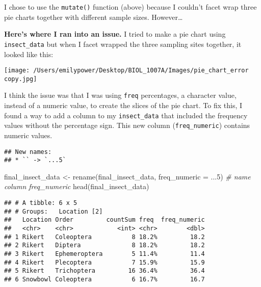 \documentclass[
]{article}
\newenvironment{Shaded}{\begin{snugshade}}{\end{snugshade}}
\newcommand{\AttributeTok}[1]{\textcolor[rgb]{0.77,0.63,0.00}{#1}}
\newcommand{\CommentTok}[1]{\textcolor[rgb]{0.56,0.35,0.01}{\textit{#1}}}
\newcommand{\DecValTok}[1]{\textcolor[rgb]{0.00,0.00,0.81}{#1}}
\newcommand{\FunctionTok}[1]{\textcolor[rgb]{0.00,0.00,0.00}{#1}}
\newcommand{\NormalTok}[1]{#1}
\newcommand{\OtherTok}[1]{\textcolor[rgb]{0.56,0.35,0.01}{#1}}
\newcommand{\SpecialCharTok}[1]{\textcolor[rgb]{0.00,0.00,0.00}{#1}}
\newcommand{\StringTok}[1]{\textcolor[rgb]{0.31,0.60,0.02}{#1}}
\begin{document}
I chose to use the \texttt{mutate()} function (above) because I couldn't
facet wrap three pie charts together with different sample sizes.
However\ldots{}

\textbf{Here's where I ran into an issue.} I tried to make a pie chart
using \texttt{insect\_data} but when I facet wrapped the three sampling
sites together, it looked like this:

\texttt{[image: /Users/emilypower/Desktop/BIOL\_1007A/Images/pie\_chart\_error copy.jpg]}

I think the issue was that I was using \texttt{freq} percentages, a
character value, instead of a numeric value, to create the slices of the
pie chart. To fix this, I found a way to add a column to my
\texttt{insect\_data} that included the frequency values without the
percentage sign. This new column (\texttt{freq\_numeric}) contains
numeric values.

\begin{Shaded}
\end{Shaded}

\begin{verbatim}
## New names:
## * `` -> `...5`
\end{verbatim}

\begin{Shaded}
\begin{Highlighting}[]
\NormalTok{final\_insect\_data }\OtherTok{\textless{}{-}} \FunctionTok{rename}\NormalTok{(final\_insect\_data, }\AttributeTok{freq\_numeric =}\NormalTok{ ...}\DecValTok{5}\NormalTok{)  }\CommentTok{\# name column \textasciigrave{}freq\_numeric\textasciigrave{}}
\FunctionTok{head}\NormalTok{(final\_insect\_data)}
\end{Highlighting}
\end{Shaded}

\begin{verbatim}
## # A tibble: 6 x 5
## # Groups:   Location [2]
##   Location Order         countSum freq  freq_numeric
##   <chr>    <chr>            <int> <chr>        <dbl>
## 1 Rikert   Coleoptera           8 18.2%         18.2
## 2 Rikert   Diptera              8 18.2%         18.2
## 3 Rikert   Ephemeroptera        5 11.4%         11.4
## 4 Rikert   Plecoptera           7 15.9%         15.9
## 5 Rikert   Trichoptera         16 36.4%         36.4
## 6 Snowbowl Coleoptera           6 16.7%         16.7
\end{verbatim}
\end{document}
